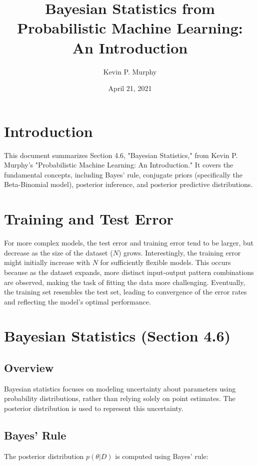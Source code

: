 \documentclass{article}
\title{Bayesian Statistics from Probabilistic Machine Learning: An Introduction}
\author{Kevin P. Murphy}
\date{April 21, 2021}
\begin{document}
\maketitle

\section{Introduction}

This document summarizes Section 4.6, "Bayesian Statistics," from Kevin P. Murphy's "Probabilistic Machine Learning: An Introduction." It covers the fundamental concepts, including Bayes' rule, conjugate priors (specifically the Beta-Binomial model), posterior inference, and posterior predictive distributions.

\section{Training and Test Error}

For more complex models, the test error and training error tend to be larger, but decrease as the size of the dataset ($N$) grows. Interestingly, the training error might initially increase with $N$ for sufficiently flexible models. This occurs because as the dataset expands, more distinct input-output pattern combinations are observed, making the task of fitting the data more challenging. Eventually, the training set resembles the test set, leading to convergence of the error rates and reflecting the model's optimal performance.

\section{Bayesian Statistics (Section 4.6)}

\subsection{Overview}

Bayesian statistics focuses on modeling uncertainty about parameters using probability distributions, rather than relying solely on point estimates. The posterior distribution is used to represent this uncertainty.

\subsection{Bayes' Rule}

The posterior distribution $p(\theta|D)$ is computed using Bayes' rule:
\end{document}
